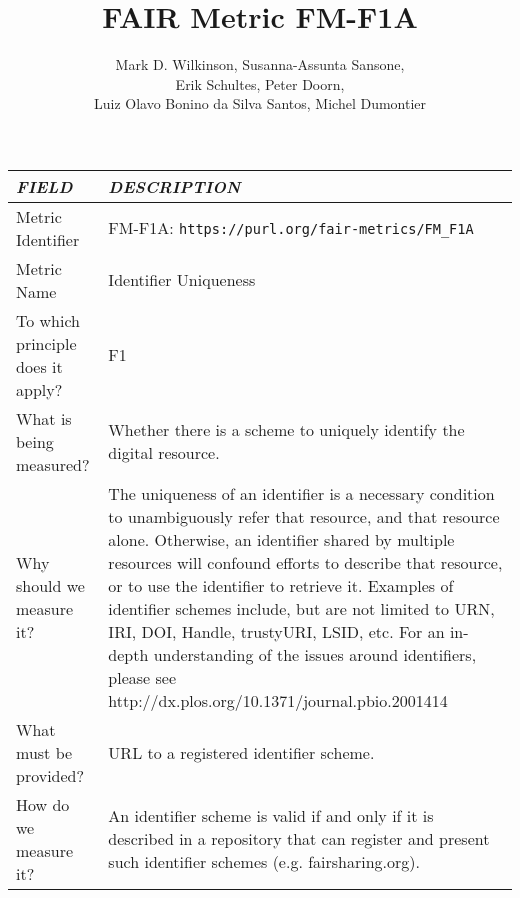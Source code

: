 \documentclass[english]{article}
\begin{document}
\title{FAIR Metric FM-F1A}

\author{Mark D. Wilkinson, Susanna-Assunta Sansone, \\Erik Schultes, Peter Doorn,\\ 
Luiz Olavo Bonino da Silva Santos, Michel Dumontier}

\maketitle

\newpage

\thispagestyle{fancy}


\centering

\begin{longtable}{|p{5cm}|p{9cm}|}
\hline
\emph{FIELD} & \emph{DESCRIPTION} \\
\hline
Metric Identifier &   FM-F1A: \verb"https://purl.org/fair-metrics/FM_F1A"
 \\


\hline
Metric Name &   Identifier Uniqueness \\



\hline
To which principle does it apply? &   F1\\



\hline
What is being measured? & Whether there is a scheme to uniquely identify the digital resource.\\



\hline
Why should we measure it? & 
The uniqueness of an identifier is a necessary condition to unambiguously refer that resource, and that resource alone. Otherwise, an identifier shared by multiple resources will confound efforts to describe that resource, or to use the identifier to retrieve it. Examples of identifier schemes include, but are not limited to URN, IRI, DOI, Handle, trustyURI, LSID, etc. For an in-depth understanding of the issues around identifiers, please see http://dx.plos.org/10.1371/journal.pbio.2001414  
\\



\hline
What must be provided? &  URL to a registered identifier scheme. \\



\hline
How do we measure it? &  
An identifier scheme is valid if and only if it is described in a repository that can register and present such identifier schemes (e.g. fairsharing.org). \newline
\newline


\end{longtable}
\end{document}
